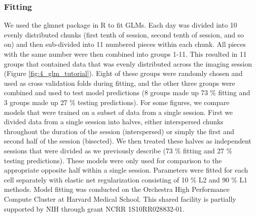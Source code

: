 \subsubsection{Fitting}\label{methods:fitting}
We used the glmnet package in R to fit GLMs. Each day was divided into 10 evenly distributed chunks (first tenth of session, second tenth of session, and so on) and then sub-divided into 11 numbered pieces within each chunk. All pieces with the same number were then combined into groups 1-11. This resulted in 11 groups that contained data that was evenly distributed across the imaging session (Figure \ref{fig:4_glm_tutorial}). Eight of these groups were randomly chosen and used as cross validation folds during fitting, and the other three groups were combined and used to test model predictions (8 groups made up 73 $\%$  fitting and 3 groups made up 27 $\%$  testing predictions). For some figures, we compare models that were trained on a subset of data from a single session. First we divided data from a single session into halves, either interspersed chunks throughout the duration of the session (interspersed) or simply the first and second half of the session (bisected). We then treated these halves as independent sessions that were divided as we previously describe (73 $\%$  fitting and 27 $\%$  testing predictions). These models were only used for comparison to the appropriate opposite half within a single session. Parameters were fitted for each cell separately with elastic net regularization consisting of 10 $\%$  L2 and 90 $\%$  L1 methods. Model fitting was conducted on the Orchestra High Performance Compute Cluster at Harvard Medical School. This shared facility is partially supported by NIH through grant NCRR 1S10RR028832-01.
 
